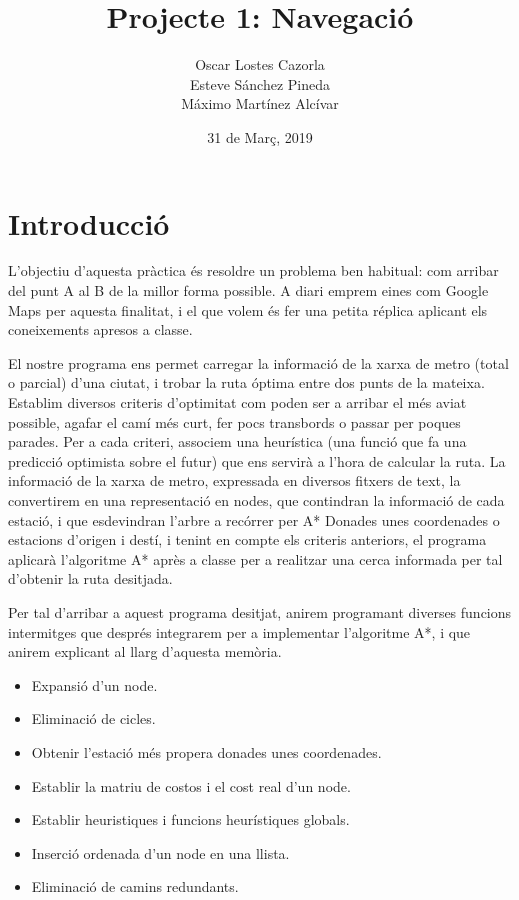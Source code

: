 \documentclass[a4paper,12pt]{article}
\begin{document}
    \title{\Large{\textbf{Projecte 1: Navegació}}}
    \author{Oscar Lostes Cazorla\\ Esteve Sánchez Pineda\\ Máximo Martínez Alcívar}
    \date{31 de Març, 2019}


    \maketitle
    \let\cleardoublepage\clearpage

    \pagebreak

    \section*{Introducció}

    L’objectiu d’aquesta pràctica és resoldre un problema ben habitual: com arribar del punt A al B de la millor forma possible. A diari emprem eines com Google Maps per aquesta finalitat, i el que volem és fer una petita réplica aplicant els coneixements apresos a classe.
    
    El nostre programa ens permet carregar la informació de la xarxa de metro (total o parcial) d’una ciutat, i trobar la ruta óptima entre dos punts de la mateixa. Establim diversos criteris d’optimitat com poden ser a arribar el més aviat possible, agafar el camí més curt, fer pocs transbords o passar per poques parades. Per a cada criteri, associem una heurística (una funció que fa una predicció optimista sobre el futur) que ens servirà a l’hora de calcular la ruta. La informació de la xarxa de metro, expressada en diversos fitxers de text, la convertirem en una representació en nodes, que contindran la informació de cada estació, i que esdevindran l’arbre a recórrer per A*
    Donades unes coordenades o estacions d'origen i destí, i tenint en compte els criteris anteriors, el programa aplicarà l’algoritme A* après a classe per a realitzar una cerca informada per tal d’obtenir la ruta desitjada.

    Per tal d’arribar a aquest programa desitjat, anirem programant diverses funcions intermitges que després integrarem per a implementar l’algoritme A*, i que anirem explicant al llarg d’aquesta memòria.
    \begin{itemize}
        \item Expansió d’un node.
        \item Eliminació de cicles.
        \item Obtenir l’estació més propera donades unes coordenades.
        \item Establir la matriu de costos i el cost real d’un node.
        \item Establir heuristiques i funcions heurístiques globals.
        \item Inserció ordenada d’un node en una llista.
        \item Eliminació de camins redundants.
    \end{itemize}
\end{document}
